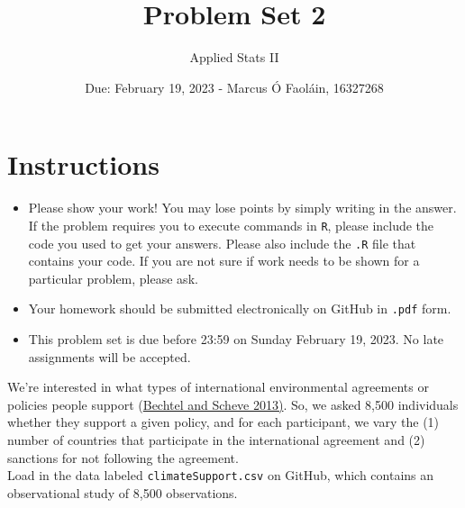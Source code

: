 \documentclass[12pt,letterpaper]{article}
\title{Problem Set 2}
\date{Due: February 19, 2023 - Marcus Ó Faoláin, 16327268}
\author{Applied Stats II}
\begin{document}
	\maketitle
	\section*{Instructions}
	\begin{itemize}
		\item Please show your work! You may lose points by simply writing in the answer. If the problem requires you to execute commands in \texttt{R}, please include the code you used to get your answers. Please also include the \texttt{.R} file that contains your code. If you are not sure if work needs to be shown for a particular problem, please ask.
		\item Your homework should be submitted electronically on GitHub in \texttt{.pdf} form.
		\item This problem set is due before 23:59 on Sunday February 19, 2023. No late assignments will be accepted.
	\end{itemize}

	
	

	\vspace{.25cm}
\noindent We're interested in what types of international environmental agreements or policies people support (\href{https://www.pnas.org/content/110/34/13763}{Bechtel and Scheve 2013)}. So, we asked 8,500 individuals whether they support a given policy, and for each participant, we vary the (1) number of countries that participate in the international agreement and (2) sanctions for not following the agreement. \\

\noindent Load in the data labeled \texttt{climateSupport.csv} on GitHub, which contains an observational study of 8,500 observations.
\end{document}
